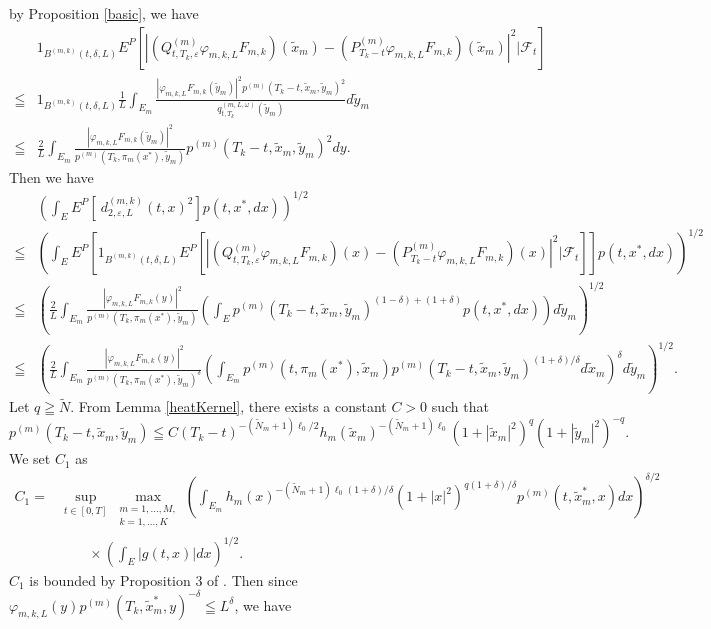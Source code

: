 \documentclass[12pt]{article}
\begin{document}
by Proposition \ref{basic}, 
we have
\begin{align*}
&1_{B^{(m,k)}(t, \delta,L)}E^P[ |(Q_{t,T_k, \varepsilon}^{(m)}\varphi_{m,k,L}F_{m,k})(\tilde{x}_m)
-(P_{T_k-t}^{(m)} \varphi_{m,k,L}F_{m,k})(\tilde{x}_m) |^2| \mathcal{F}_t]\\
\leqq &1_{B^{(m,k)}(t, \delta,L)} \frac{1}{L} \int_{E_m} \frac{|\varphi_{m,k,L}F_{m,k}(\tilde{y}_m)|^2p^{(m)}(T_k-t, \tilde{x}_m,\tilde{y}_m)^2}{q_{t,T_k}^{(m,L,\omega)}(\tilde{y}_m)}d\tilde{y}_m\\
\leqq &\frac{2}{L} \int_{E_m} \frac{|\varphi_{m,k,L}F_{m,k}(\tilde{y}_m)|^2}{p^{(m)}(T_k, \pi_m(x^*),\tilde{y}_m)} p^{(m)}(T_k-t, \tilde{x}_m,\tilde{y}_m)^2 dy.
\end{align*}
Then we have
\begin{align*}
&(\int_{E} E^P[\ d_{2,\varepsilon,L}^{(m,k)}(t,x)^2] p(t, x^*, dx))^{1/2} \\
\leqq &(\int_{E}  E^P[1_{B^{(m,k)}(t, \delta,L)}E^P[ |(Q_{t,T_k, \varepsilon}^{(m)}\varphi_{m,k,L}F_{m,k})(x)
-(P_{T_k-t}^{(m)} \varphi_{m,k,L}F_{m,k})(x) |^2| \mathcal{F}_t] ]p(t, x^*, dx))^{1/2}\\
\leqq &(\frac{2}{L} \int_{E_m} \frac{|\varphi_{m,k,L}F_{m,k}(y)|^2}{p^{(m)}(T_k, \pi_m(x^*),\tilde{y}_m)} 
(\int_{E} p^{(m)}(T_k-t, \tilde{x}_m,\tilde{y}_m)^{(1-\delta)+(1+\delta)} p(t, x^*, dx))d\tilde{y}_m)^{1/2}\\
\leqq &(\frac{2}{L} \int_{E_m} \frac{|\varphi_{m,k,L}F_{m,k}(y)|^2}{p^{(m)}(T_k, \pi_m(x^*),\tilde{y}_m)^{\delta}} 
(\int_{E_m} p^{(m)}(t, \pi_m(x^*), \tilde{x}_m) p^{(m)}(T_k-t, \tilde{x}_m,\tilde{y}_m)^{(1+\delta)/\delta}d\tilde{x}_m)^{\delta}d\tilde{y}_m)^{1/2}.
\end{align*}
Let $q \geqq \tilde{N}.$ From Lemma \ref{heatKernel}, there exists a constant $C>0$ such that 
$$p^{(m)}(T_k-t, \tilde{x}_m,\tilde{y}_m) \leqq C(T_k-t)^{-(\tilde{N}_m+1)\ell_0/2}h_m(\tilde{x}_m)^{-(\tilde{N}_m+1)\ell_0}(1+|\tilde{x}_m|^2)^q(1+|\tilde{y}_m|^2)^{-q}.$$
We set $C_1$ as
\begin{align*}
C_1=&\sup_{t\in[0,T]}\max_{\substack{m=1,\ldots,M,\\ k=1,\ldots,K}}(\int_{E_m} h_m(x)^{-(\tilde{N}_m+1)\ell_0(1+\delta)/\delta}(1+|x|^2)^{q(1+\delta)/\delta}p^{(m)}(t, \tilde{x}_m^*,x)dx)^{\delta/2}\\
&\quad \quad \times (\int_E|g(t,x)|dx)^{1/2}.
\end{align*}
$C_1$ is bounded by Proposition 3 of \cite{KM}.
Then since $\varphi_{m,k,L}(y)p^{(m)}(T_k, \tilde{x}_m^*,y)^{-\delta} \leqq L^{\delta}$,  we have
\end{document}
